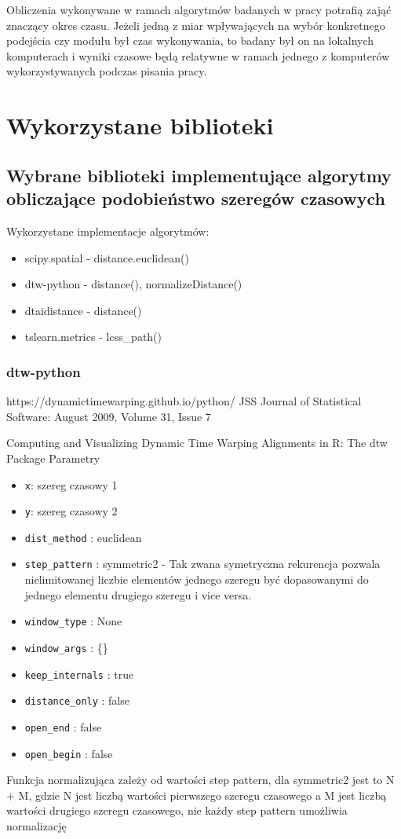     Obliczenia wykonywane w ramach algorytmów badanych w pracy potrafią zająć znaczący okres czasu. Jeżeli jedną z miar wpływających na wybór konkretnego podejścia czy modułu był czas wykonywania, to badany był on na lokalnych komputerach i wyniki czasowe będą relatywne w ramach jednego z komputerów wykorzystywanych podczas pisania pracy.
    
\section{Wykorzystane biblioteki}
\subsection{Wybrane biblioteki implementujące algorytmy obliczające podobieństwo szeregów czasowych}
Wykorzystane implementacje algorytmów:
\begin{itemize}
    \item scipy.spatial - distance.euclidean()
    \item dtw-python - distance(), normalizeDistance()
    \item dtaidistance - distance()
    \item tslearn.metrics - lcss\_path()
\end{itemize}
\subsubsection{dtw-python}
    https://dynamictimewarping.github.io/python/
    \newline
    JSS Journal of Statistical Software: August 2009, Volume 31, Issue 7 \par
    Computing and Visualizing Dynamic Time Warping
    Alignments in R: The dtw Package
    \newline Parametry \begin{itemize}
        \item \texttt{x}: szereg czasowy 1
        \item \texttt{y}: szereg czasowy 2
        \item {\texttt{dist\_method} : euclidean}
        \item {\texttt{step\_pattern} : symmetric2} - Tak zwana symetryczna rekurencja pozwala nielimitowanej liczbie elementów jednego szeregu być dopasowanymi do jednego elementu drugiego szeregu i vice versa. 
        \item {\texttt{window\_type} : None}
        \item {\texttt{window\_args} : \{\}}
        \item {\texttt{keep\_internals} : true}
        \item {\texttt{distance\_only} : false}
        \item {\texttt{open\_end} : false}
        \item {\texttt{open\_begin} : false}
    \end{itemize}
    Funkcja normalizująca zależy od wartości step pattern, dla symmetric2 jest to N + M, gdzie N jest liczbą wartości pierwszego szeregu czasowego a M jest liczbą wartości drugiego szeregu czasowego, nie każdy step pattern umożliwia normalizację
